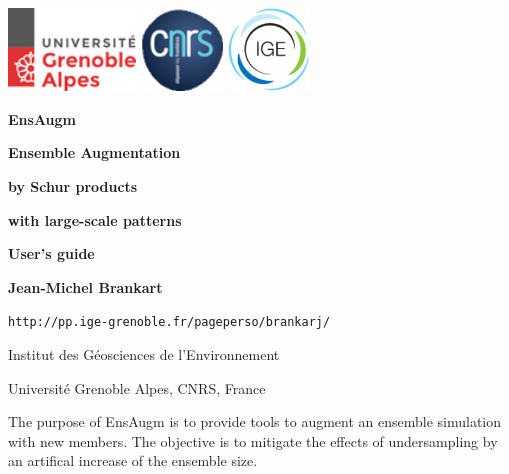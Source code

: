 \documentclass[11pt]{article}
\begin{document}
\pagestyle{empty}

\centerline{
\includegraphics[height=22mm]{Logos/logo_uga.png}
\hspace{5mm}
\includegraphics[height=22mm]{Logos/logo_cnrs.png}
\hfill
\includegraphics[height=22mm]{Logos/logo_ige.png}
}

\vspace{20mm}

\begin{center}

{\Huge\bf EnsAugm}

\vspace{10mm}

\centerline{\Large\bf Ensemble Augmentation}
\centerline{\Large\bf by Schur products}
\centerline{\Large\bf with large-scale patterns}

\vspace{10mm}

{\Large\bf User's guide}

\vspace{10mm}

{\large\bf Jean-Michel Brankart}

\vspace{5mm}
{\tt http://pp.ige-grenoble.fr/pageperso/brankarj/}

\vspace{5mm}
{\large Institut des G\'eosciences de l'Environnement}

\vspace{1mm}
{\large Universit\'e Grenoble Alpes, CNRS, France}

\end{center}

\vspace{20mm}
The purpose of EnsAugm is to provide tools
to augment an ensemble simulation with new members.
The objective is to mitigate the effects of undersampling
by an artifical increase of the ensemble size.
\end{document}
